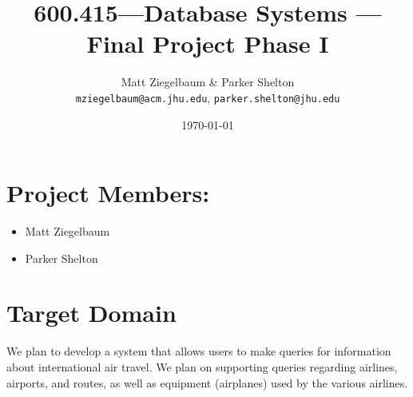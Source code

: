 \documentclass[12pt]{article}
\author{Matt Ziegelbaum \& Parker Shelton\\\texttt{mziegelbaum@acm.jhu.edu}, \texttt{parker.shelton@jhu.edu}}
\title{600.415---Database Systems --- Final Project Phase I}
\date{\today}
\begin{document}
  \maketitle
  
  \section{Project Members:}
  \begin{itemize}
    \item Matt Ziegelbaum
    \item Parker Shelton
  \end{itemize}
  
  \section{Target Domain}
  We plan to develop a system that allows users to make queries for information about international air travel. We plan on supporting queries regarding airlines, airports, and routes, as well as equipment (airplanes) used by the various airlines.
  
\end{document}
